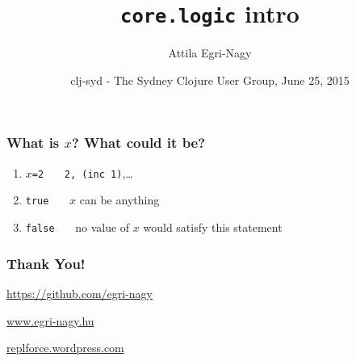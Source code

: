 \documentclass{beamer}
\begin{document}
\title[core.logic.intro]{\texttt{core.logic} intro}
\author[e-n@]{Attila Egri-Nagy}
\date[(nth clj-syd 31)]{clj-syd - The Sydney Clojure User Group, June 25, 2015}

\maketitle

\begin{frame}\frametitle{What is $x$? What could it be?}
\begin{enumerate}
\item $x$\texttt{=2} \pause\ \ \ \texttt{2, (inc 1)},\ldots
\item \texttt{true} \pause\ \ \ $x$ can be anything
\item \texttt{false} \pause\ \ \ no value of $x$ would satisfy this statement
\end{enumerate}
\end{frame}


\begin{frame}\frametitle{Thank You!}
\begin{center}
\huge
\url{https://github.com/egri-nagy}

\url{www.egri-nagy.hu}

\url{replforce.wordpress.com}

\end{center}
\end{frame}
\end{document}
